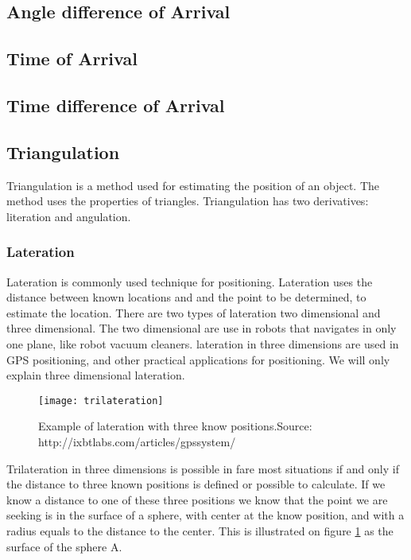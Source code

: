   \subsection{Angle difference of Arrival}

  \subsection{Time of Arrival}

  \subsection{Time difference of Arrival}

  \subsection{Triangulation}

  Triangulation is a method used for estimating the position of an object. The method uses the properties of triangles. Triangulation has two derivatives: literation and angulation.

 \subsubsection{Lateration}

  Lateration is commonly used technique for positioning.  Lateration uses the distance between known locations and and the point to be determined, to estimate the location.\cite{tri_lateration}  There are two types of lateration two dimensional and three dimensional. The two dimensional are use in robots that navigates in only one plane, like robot vacuum cleaners. 
  lateration in three dimensions are used in GPS positioning, and other practical applications for positioning.
  We will only explain three dimensional lateration.
  \begin{figure}[h!]
  \centering
  \texttt{[image: trilateration]}
  \caption{Example of lateration with three know positions.\newline Source: http://ixbtlabs.com/articles/gpssystem/}
  \label{fig:trilateration}
  \end{figure}
  

  Trilateration in three dimensions is possible in fare most situations if and only if the distance to three known positions is defined or possible to calculate.
  If we know a distance to one of these three positions we know that the point we are seeking is in the surface of a sphere, with center at the know position, and with a radius equals to the distance to the center. This is illustrated on figure \ref{fig:trilateration} as the surface of the sphere A.

